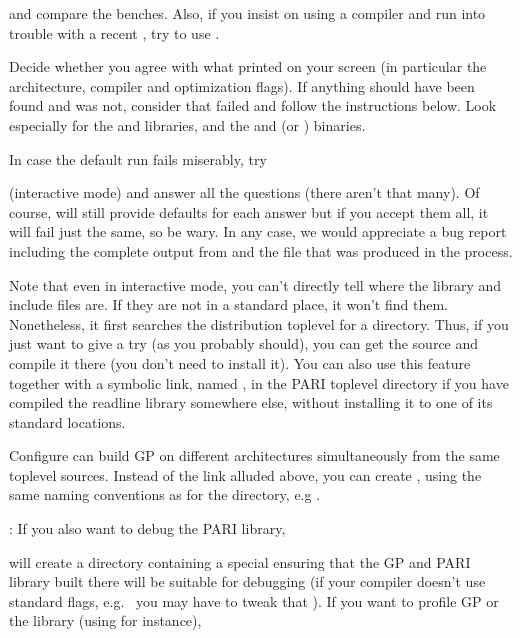 \noindent and compare the benches. Also, if you insist on using a 
compiler and run into trouble with a recent , try to use
.

 Decide whether you agree with what
 printed on your screen (in particular the architecture,
compiler and optimization flags). If anything should have been found and was
not, consider that  failed and follow the instructions below.
Look especially for the  and  libraries, and the
 and  (or ) binaries.

In case the default  run fails miserably, try


\noindent (interactive mode) and answer all the questions (there aren't that
many). Of course,  will still provide defaults for each answer
but if you accept them all, it will fail just the same, so be wary. In any
case, we would appreciate a bug report including the complete output from
 and the file  that was produced in
the process.

Note that even in interactive mode, you can't directly tell 
where the  library and include files are. If they are not in a
standard place, it won't find them. Nonetheless, it first searches the
distribution toplevel for a  directory. Thus, if you just want
to give  a try (as you probably should), you can get the source
and compile it there (you don't need to install it). You can also use this
feature together with a symbolic link, named , in the PARI
toplevel directory if you have compiled the readline library somewhere else,
without installing it to one of its standard locations. 

 Configure can build GP on different architectures
simultaneously from the same toplevel sources. Instead of the 
link alluded above, you can create ,
using the same naming conventions as for the  directory,
e.g .

: If you also want to debug the PARI library,


\noindent will create a directory  containing a special
 ensuring that the GP and PARI library built there will be
suitable for debugging (if your compiler doesn't use standard flags,
e.g.~ you may have to tweak that ). If you want to
profile GP or the library (using  for instance), 

